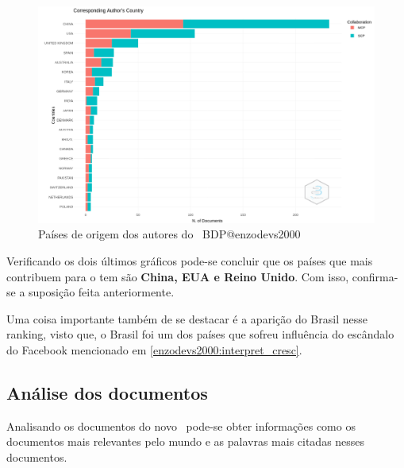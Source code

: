 \begin{figure}[H]
    \centering
    \includegraphics[width=1\textwidth]{experiments/enzodevs2000/AnaliseBibliometrica/BigDataInPolicy/Figures/Graficos/NovoDataset/Authors/authorsCountries.png}
    \caption{Países de origem dos autores do
    \dataset\ BDP@enzodevs2000}
    \label{fig:enzodevs2000:BDP:newdataset:authors:authors_countries}
\end{figure}

Verificando os dois últimos gráficos pode-se concluir que os países que mais contribuem para o tem são \textbf{China, EUA e Reino Unido}. Com isso, confirma-se a suposição feita anteriormente.

Uma coisa importante também de se destacar é a aparição do Brasil nesse ranking, visto que, o Brasil foi um dos países que sofreu influência do escândalo do Facebook mencionado em \ref{enzodevs2000:interpret_cresc}.

\subsection{Análise dos documentos}

Analisando os documentos do novo \dataset\ pode-se obter informações como os documentos mais relevantes pelo mundo e as palavras mais citadas nesses documentos.

